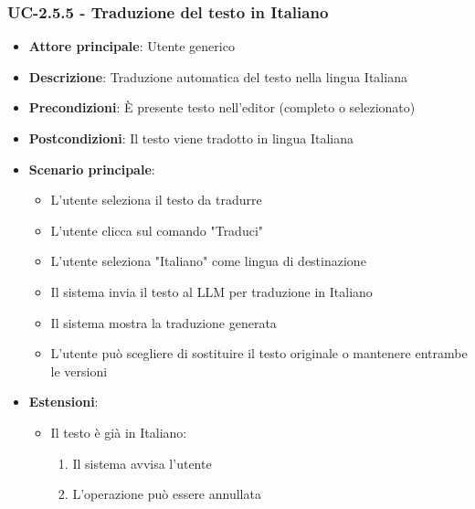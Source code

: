 \documentclass[11pt,a4paper]{article}
\begin{document}
\subsubsection{UC-2.5.5 - Traduzione del testo in Italiano}
\begin{itemize}
    \item \textbf{Attore principale}: Utente generico
    \item \textbf{Descrizione}: Traduzione automatica del testo nella lingua Italiana
    \item \textbf{Precondizioni}: È presente testo nell'editor (completo o selezionato)
    \item \textbf{Postcondizioni}: Il testo viene tradotto in lingua Italiana
    \item \textbf{Scenario principale}:
        \begin{itemize}
            \item L'utente seleziona il testo da tradurre
            \item L'utente clicca sul comando "Traduci"
            \item L'utente seleziona "Italiano" come lingua di destinazione
            \item Il sistema invia il testo al LLM per traduzione in Italiano
            \item Il sistema mostra la traduzione generata
            \item L'utente può scegliere di sostituire il testo originale o mantenere entrambe le versioni
        \end{itemize}
    \item \textbf{Estensioni}:
        \begin{itemize}
            \item Il testo è già in Italiano:
                \begin{enumerate}
                    \item Il sistema avvisa l'utente
                    \item L'operazione può essere annullata
                \end{enumerate}
        \end{itemize}
\end{itemize}
\end{document}
